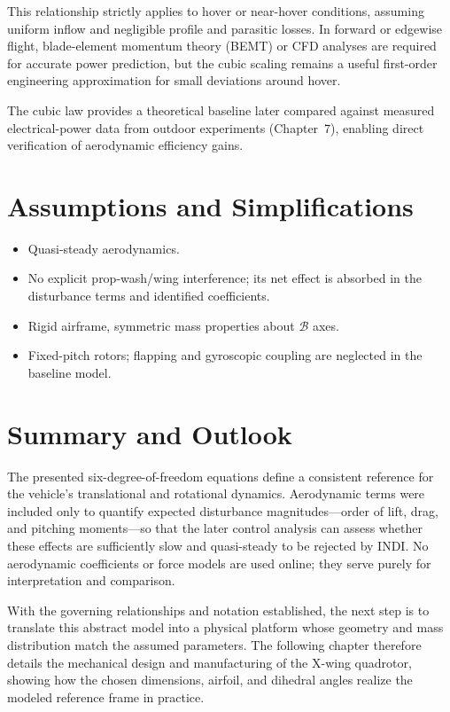 This relationship strictly applies to hover or near-hover conditions, assuming uniform inflow and negligible profile and parasitic losses. In forward or edgewise flight, blade-element momentum theory (BEMT) or CFD analyses are required for accurate power prediction, but the cubic scaling remains a useful first-order engineering approximation for small deviations around hover.

The cubic law provides a theoretical baseline later compared against measured electrical-power data from outdoor experiments (Chapter~7), enabling direct verification of aerodynamic efficiency gains.

\section{Assumptions and Simplifications}
\begin{itemize}
  \item Quasi-steady aerodynamics.
  \item No explicit prop-wash/wing interference; its net effect is absorbed in the disturbance terms and identified coefficients.
  \item Rigid airframe, symmetric mass properties about $\mathcal{B}$ axes.
  \item Fixed-pitch rotors; flapping and gyroscopic coupling are neglected in the baseline model.
\end{itemize}

\section{Summary and Outlook}
The presented six-degree-of-freedom equations define a consistent reference for the vehicle's translational and rotational dynamics. Aerodynamic terms were included only to quantify expected disturbance magnitudes---order of lift, drag, and pitching moments---so that the later control analysis can assess whether these effects are sufficiently slow and quasi-steady to be rejected by INDI. No aerodynamic coefficients or force models are used online; they serve purely for interpretation and comparison.

With the governing relationships and notation established, the next step is to translate this abstract model into a physical platform whose geometry and mass distribution match the assumed parameters. The following chapter therefore details the mechanical design and manufacturing of the X-wing quadrotor, showing how the chosen dimensions, airfoil, and dihedral angles realize the modeled reference frame in practice.
